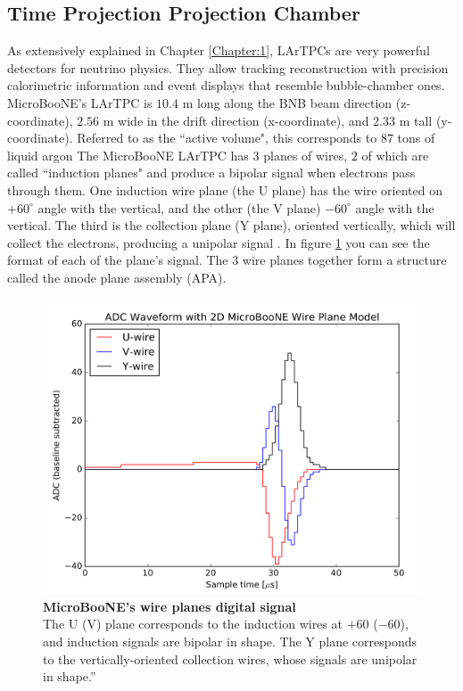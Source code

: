 \subsection{Time Projection Projection Chamber}
As extensively explained in Chapter \ref{Chapter:1}, LArTPCs are very powerful detectors for neutrino physics. They allow tracking reconstruction with precision calorimetric information and event displays that resemble bubble-chamber ones. MicroBooNE's LArTPC is $10.4$ m long along the BNB beam direction (z-coordinate), $2.56$ m wide in the drift direction (x-coordinate), and $2.33$ m tall (y-coordinate). Referred to as the ``active volume", this corresponds to $87$ tons of liquid argon  
%
The MicroBooNE LArTPC has $3$ planes of wires, $2$ of which are called ``induction planes" and produce a bipolar signal when electrons pass through them. One induction wire plane (the U plane) has the wire oriented on $+60^{\circ}$ angle with the vertical, and the other (the V plane) $-60^{\circ}$ angle with the vertical. The third is the collection plane (Y plane), oriented vertically, which will collect the electrons, producing a unipolar signal \cite{microboone_electronics}. In figure \ref{uboone_digital_signal} you can see the format of each of the plane's signal. The $3$ wire planes together form a structure called the anode plane assembly (APA). 
%
\begin{figure}[h!]
	\begin{center}
		\includegraphics[scale=0.25]{Figures/uboone_dig_signal.png}
		\caption[MicroBooNE's wire planes digital signal]{{\textbf{MicroBooNE's wire planes digital signal}}  \\ The U (V) plane corresponds to the induction wires at $+60$ ($-60$), and induction signals are bipolar in shape. The Y plane corresponds to the vertically-oriented collection wires, whose signals are unipolar in shape.”
        \cite{microboone_electronics}}
		\label{uboone_digital_signal}	
	\end{center}
\end{figure}
